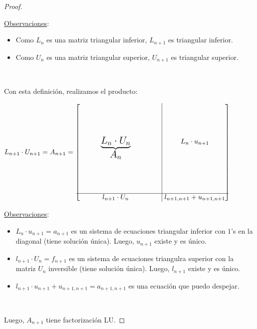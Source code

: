 \documentclass[]{article}
\begin{document}
\begin{prop}
\begin{proof}
		~\newline

		\underline{Observaciones}:
		\begin{itemize}
			\item Como $L_n$ es una matriz triangular inferior, $L_{n+1}$ es triangular inferior.
			\item Como $U_n$ es una matriz triangular superior, $U_{n+1}$ es triangular superior.
		\end{itemize}
		~\newline

		Con esta definición, realizamos el producto:
		\begin{center}
		$L_{n+1}\cdot U_{n+1} = A_{n+1}=\begin{bmatrix}
			 & & & & & & & & \multicolumn{1}{|c}{} & \\
			 & & & & & & & & \multicolumn{1}{|c}{} & \\
			 & & & & & & & & \multicolumn{1}{|c}{} & \\
			 & & & & & & & & \multicolumn{1}{|c}{} & \\
			 & & & \underbrace{\mbox{\Large{$L_n\cdot U_n$}}}_{\mbox{\Large{$A_n$}}} & & & & & \multicolumn{1}{|c}{} & \hspace{-0.4cm}L_{n}\cdot u_{n+1}\\
			 & & & & & & & & \multicolumn{1}{|c}{} & \\
			 & & & & & & & & \multicolumn{1}{|c}{} & \\
			 & & & & & & & & \multicolumn{1}{|c}{} & \\
			 & & & & & & & & \multicolumn{1}{|c}{} & \\
			\cline{1-10}
			 & & & l_{n+1}\cdot U_n & & & & & \multicolumn{1}{|c}{} & \hspace{-0.4cm}l_{n+1,n+1} + u_{n+1,n+1}\\
		\end{bmatrix}$
		\end{center}

		\underline{Observaciones}:
		\begin{itemize}
			\item $L_n\cdot u_{n+1} = a_{n+1}$ es un sistema de ecuaciones triangular inferior con $1$'s en la diagonal (tiene solución única). Luego, $u_{n+1}$ existe y es único.
			\item $l_{n+1}\cdot U_n = f_{n+1}$ es un sistema de ecuaciones triangulra superior con la matriz $U_n$ inversible (tiene solución única). Luego, $l_{n+1}$ existe y es único.
			\item $l_{n+1}\cdot u_{n+1} + u_{n+1,n+1} = a_{n+1,n+1}$ es una ecuación que puedo despejar.
		\end{itemize}
		~\newline

		Luego, $A_{n+1}$ tiene factorización LU.

	\end{proof}
\end{prop}
\end{document}
